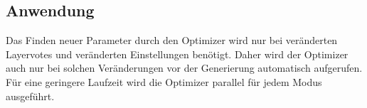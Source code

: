 \subsection{Anwendung}
Das Finden neuer Parameter durch den Optimizer wird nur bei veränderten Layervotes und veränderten Einstellungen benötigt.
Daher wird der Optimizer auch nur bei solchen Veränderungen vor der Generierung automatisch aufgerufen. 
Für eine geringere Laufzeit wird die Optimizer parallel für jedem Modus ausgeführt.